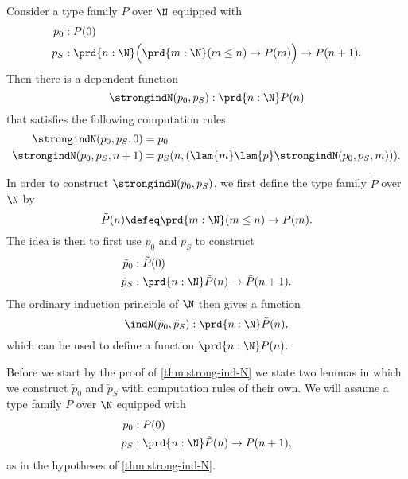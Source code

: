 \begin{thm}\label{thm:strong-ind-N}
  Consider a type family $P$ over $\N$ equipped with
  \begin{align*}
    p_0 & : P(0) \\
    p_S & : \prd{n:\N}\Big(\prd{m:\N}(m\leq n)\to P(m)\Big)\to P(n+1).
  \end{align*}
  Then there is a dependent function
  \begin{equation*}
    \strongindN(p_0,p_S) : \prd{n:\N}P(n)
  \end{equation*}
  that satisfies the following computation rules
  \begin{align*}
    \strongindN(p_0,p_S,0) & = p_0 \\
    \strongindN(p_0,p_S,n+1) & = p_S(n,(\lam{m}\lam{p}\strongindN(p_0,p_S,m))).
  \end{align*}
\end{thm}

In order to construct $\strongindN(p_0,p_S)$, we first define the type family $\tilde{P}$ over $\N$ by
\begin{equation*}
  \tilde{P}(n)\defeq \prd{m:\N} (m\leq n)\to P(m).
\end{equation*}
The idea is then to first use $p_0$ and $p_S$ to construct
\begin{align*}
  \tilde{p}_0 & : \tilde{P}(0) \\
  \tilde{p}_S & :\prd{n:\N}\tilde{P}(n)\to\tilde{P}(n+1).
\end{align*}
The ordinary induction principle of $\N$ then gives a function
\begin{equation*}
  \indN(\tilde{p}_0,\tilde{p}_S):\prd{n:\N}\tilde{P}(n),
\end{equation*}
which can be used to define a function $\prd{n:\N}P(n)$.

Before we start by the proof of \cref{thm:strong-ind-N} we state two lemmas in which we construct $\tilde{p}_0$ and $\tilde{p}_S$ with computation rules of their own. We will assume a type family $P$ over $\N$ equipped with
  \begin{align*}
    p_0 & : P(0) \\
    p_S & : \prd{n:\N}\tilde{P}(n) \to P(n+1),
  \end{align*}
as in the hypotheses of \cref{thm:strong-ind-N}.

